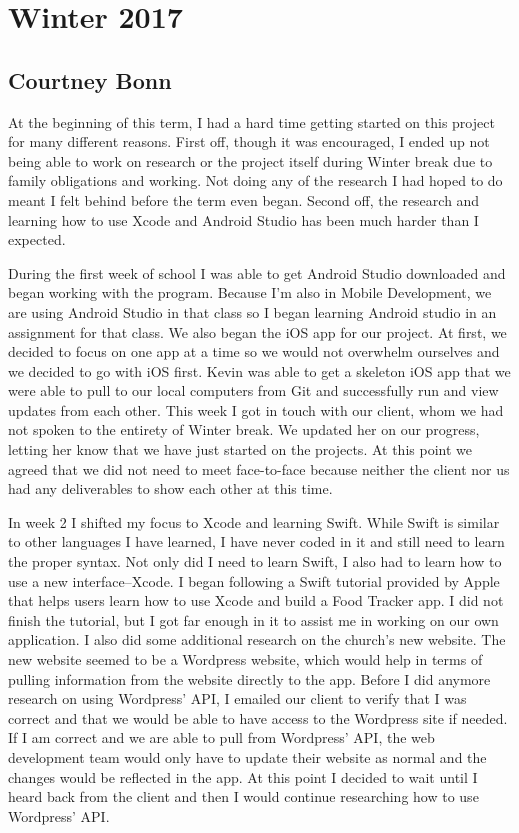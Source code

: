 \documentclass[letterpaper,10pt,draftclsnofoot,onecolumn,titlepage]{IEEEtran}
\begin{document}
\section{Winter 2017}

	\subsection{Courtney Bonn}
	At the beginning of this term, I had a hard time getting started on this project for many different reasons.
	First off, though it was encouraged, I ended up not being able to work on research or the project itself during Winter break due to family obligations and working.
	Not doing any of the research I had hoped to do meant I felt behind before the term even began.
	Second off, the research and learning how to use Xcode and Android Studio has been much harder than I expected.

	During the first week of school I was able to get Android Studio downloaded and began working with the program.
	Because I'm also in Mobile Development, we are using Android Studio in that class so I began learning Android studio in an assignment for that class.
	We also began the iOS app for our project.
	At first, we decided to focus on one app at a time so we would not overwhelm ourselves and we decided to go with iOS first.
	Kevin was able to get a skeleton iOS app that we were able to pull to our local computers from Git and successfully run and view updates from each other.
	This week I got in touch with our client, whom we had not spoken to the entirety of Winter break.
	We updated her on our progress, letting her know that we have just started on the projects.
	At this point we agreed that we did not need to meet face-to-face because neither the client nor us had any deliverables to show each other at this time.

	In week 2 I shifted my focus to Xcode and learning Swift.
	While Swift is similar to other languages I have learned, I have never coded in it and still need to learn the proper syntax.
	Not only did I need to learn Swift, I also had to learn how to use a new interface--Xcode.
	I began following a Swift tutorial provided by Apple that helps users learn how to use Xcode and build a Food Tracker app.
	I did not finish the tutorial, but I got far enough in it to assist me in working on our own application.
	I also did some additional research on the church's new website.
	The new website seemed to be a Wordpress website, which would help in terms of pulling information from the website directly to the app.
	Before I did anymore research on using Wordpress' API, I emailed our client to verify that I was correct and that we would be able to have access to the Wordpress site if needed.
	If I am correct and we are able to pull from Wordpress' API, the web development team would only have to update their website as normal and the changes would be reflected in the app.
	At this point I decided to wait until I heard back from the client and then I would continue researching how to use Wordpress' API.
\end{document}
